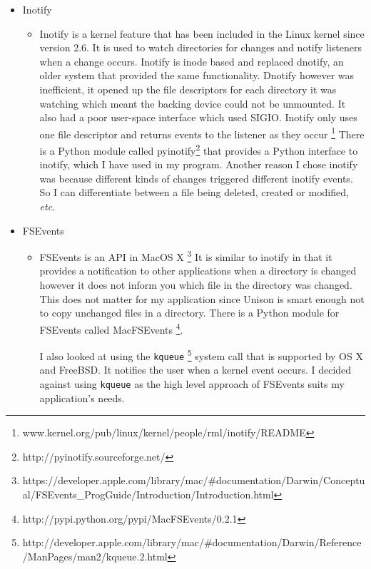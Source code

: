 \documentclass[12pt]{article}
\begin{document}
\begin{itemize}
    \item Inotify
        \begin{itemize}
        \item Inotify is a kernel feature that has been
        included in the Linux kernel since version 2.6.
        It is used to watch directories for changes
        and notify listeners when a change occurs. Inotify
        is inode based and replaced dnotify, an older system
        that provided the same functionality. Dnotify however was
        inefficient, it opened up the file descriptors for
        each directory it was watching which meant the backing
        device could not be unmounted. 
        It also had a poor
        user-space interface which used SIGIO. Inotify only
        uses one file descriptor and returns events to the
        listener as they occur
        \footnote{www.kernel.org/pub/linux/kernel/people/rml/inotify/README}
        There is a Python module
        called pyinotify\footnote{http://pyinotify.sourceforge.net/}
        that provides a Python interface
        to inotify, which I have used in my program.
        Another reason I chose inotify was because different kinds
        of changes triggered different inotify events. So I
        can differentiate between a file being deleted, created
        or modified, \emph{etc}.
        \end{itemize}

    \item FSEvents
        \begin{itemize}
        \item FSEvents is an API in MacOS X
        \footnote{https://developer.apple.com/library/mac/\#documentation/Darwin/Conceptual/FSEvents\_ProgGuide/Introduction/Introduction.html}
        It is similar
        to inotify in that it provides a notification to other
        applications when a directory is changed however
        it does not inform you which file in the directory
        was changed. This does not matter for my
        application since Unison is smart enough not to copy
        unchanged files in a directory. There is a Python module
        for FSEvents called MacFSEvents
        \footnote{http://pypi.python.org/pypi/MacFSEvents/0.2.1}. 
        
        I also looked at using the \texttt{kqueue}
        \footnote{http://developer.apple.com/library/mac/\#documentation/Darwin/Reference/ManPages/man2/kqueue.2.html}
        system call that is
        supported by OS X and FreeBSD. It notifies the user
        when a kernel event occurs. I decided against using
        \texttt{kqueue} as the high level approach of FSEvents
        suits my application's needs.
        \end{itemize}


\end{itemize}
\end{document}
